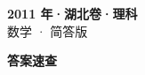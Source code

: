 \documentclass[zihao=-4, a4paper]{ctexart}
\begin{document}
\begin{center}
  {\Large\bfseries 2011 年·湖北卷·理科}\\[4pt]
  {\large 数学 · 简答版}
\end{center}
\medskip
{}

\clearpage
{}
\begin{center}{\Large\bfseries 答案速查}\end{center}
\medskip

\end{document}
